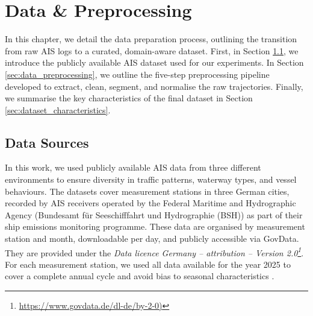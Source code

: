 \chapter{Data \& Preprocessing} 
\label{chap:dataset}
\acresetall %



In this chapter, %
we detail the data preparation process, outlining the transition from raw \ac{AIS} logs to a curated, domain-aware dataset.
First, in Section \ref{sec:data_sources}, we introduce the publicly available \ac{AIS} dataset used for our experiments. In Section \ref{sec:data_preprocessing}, we outline the five-step preprocessing pipeline developed to extract, clean, segment, and normalise the raw trajectories. Finally, we summarise the key characteristics of the final dataset in Section \ref{sec:dataset_characteristics}.

\section{Data Sources}
\label{sec:data_sources}
In this work, we used publicly available \ac{AIS} data from three different environments to ensure diversity in traffic patterns, waterway types, and vessel behaviours.
The datasets cover measurement stations in three German cities, %
recorded by \ac{AIS} receivers operated by the Federal Maritime and Hydrographic Agency (Bundesamt für Seeschifffahrt und Hydrographie (BSH)) as part of their ship emissions monitoring programme. 
These data are organised by measurement station and month, downloadable per day, and publicly accessible via GovData. They are provided under the \emph{Data licence Germany – attribution – Version 2.0\footnote{\url{https://www.govdata.de/dl-de/by-2-0)}}}.
 For each measurement station, we used all data available for the year 2025 to cover a complete annual cycle and avoid bias to seasonal characteristics \parencite{bsh_ais_kiel_2025, bsh_ais_bremerhaven_2025, bsh_ais_wedel_2025}.

